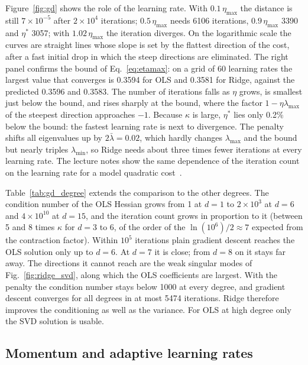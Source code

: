 \documentclass[aps,reprint,amsmath,amssymb,nofootinbib,floatfix]{revtex4-2}
\newcommand{\lb}{\bar\lambda}
\begin{document}
Figure~\ref{fig:gd} shows the role of the learning rate. With $0.1\,\eta_{\max}$ the distance is
still $7\times10^{-5}$ after $2\times10^{4}$ iterations; $0.5\,\eta_{\max}$ needs 6106
iterations, $0.9\,\eta_{\max}$ 3390 and $\eta^*$ 3057; with $1.02\,\eta_{\max}$ the iteration
diverges. On the logarithmic scale the curves are straight lines whose slope is set by the
flattest direction of the cost, after a fast initial drop in which the steep directions are
eliminated. The right panel confirms the bound of Eq.~\eqref{eq:etamax}: on a grid of 60 learning
rates the largest value that converges is 0.3594 for OLS and 0.3581 for Ridge, against the
predicted 0.3596 and 0.3583. The number of iterations falls as $\eta$ grows, is smallest just
below the bound, and rises sharply at the bound, where the factor $1-\eta\lambda_{\max}$ of the
steepest direction approaches $-1$. Because $\kappa$ is large, $\eta^*$ lies only 0.2\% below the
bound: the fastest learning rate is next to divergence. The penalty shifts all eigenvalues up by
$2\lb=0.02$, which hardly changes $\lambda_{\max}$ and the bound but nearly triples
$\lambda_{\min}$, so Ridge needs about three times fewer iterations at every learning rate. The
lecture notes show the same dependence of the iteration count on the learning rate for a model
quadratic cost~\cite{hjorthjensen2026}.

Table~\ref{tab:gd_degree} extends the comparison to the other degrees. The condition number of
the OLS Hessian grows from 1 at $d=1$ to $2\times10^{3}$ at $d=6$ and $4\times10^{10}$ at $d=15$,
and the iteration count grows in proportion to it (between 5 and 8 times $\kappa$ for $d=3$ to 6,
of the order of the $\ln(10^{6})/2\approx7$ expected from the contraction factor). Within $10^{5}$
iterations plain gradient descent reaches the OLS solution only up to $d=6$. At $d=7$ it is close;
from $d=8$ on it stays far away. The directions it cannot reach are the weak singular modes of
Fig.~\ref{fig:ridge_svd}, along which the OLS coefficients are largest. With the penalty the
condition number stays below 1000 at every degree, and gradient descent converges for all degrees
in at most 5474 iterations. Ridge therefore improves the conditioning as well as the variance. For
OLS at high degree only the SVD solution is usable.

\subsection{Momentum and adaptive learning rates}\label{sec:res_opt}
\end{document}
